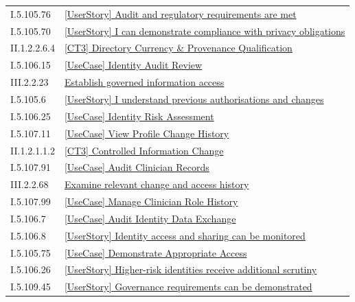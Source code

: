 \begin{longtable}{p{.22\linewidth}p{.73\linewidth}}
I.5.105.76 & \hyperref[element:099a6a3867e642549643b118e369f373]{[UserStory] Audit and regulatory requirements are met} \\
I.5.105.70 & \hyperref[element:0cda4d7a2b424c6a835ad371de1706ab]{[UserStory] I can demonstrate compliance with privacy obligations} \\
II.1.2.2.6.4 & \hyperref[element:21e0c3d5b39b4d6c9c082241150f1f09]{[CT3] Directory Currency \& Provenance Qualification} \\
I.5.106.15 & \hyperref[element:238b0a03b40b42e98701e8d815e8474d]{[UseCase] Identity Audit Review} \\
III.2.2.23 & \hyperref[element:26719186d6444b5b80029fbf13ae7d06]{Establish governed information access} \\
I.5.105.6 & \hyperref[element:29d5c982a25a456aa61e273d0dbaad89]{[UserStory] I understand previous authorisations and changes} \\
I.5.106.25 & \hyperref[element:29ed8bc9509742f4be49e07fed848510]{[UseCase] Identity Risk Assessment} \\
I.5.107.11 & \hyperref[element:2c2a6d9b0f6549e8ab880d7c5b6064ba]{[UseCase] View Profile Change History} \\
II.1.2.1.1.2 & \hyperref[element:2eed03f280434e369d7118b63259c02d]{[CT3] Controlled Information Change} \\
I.5.107.91 & \hyperref[element:38728966a1a144aeacdf62cef66a0c75]{[UseCase] Audit Clinician Records} \\
III.2.2.68 & \hyperref[element:39211c37cd3c4d3a8cdfe49d044c7f43]{Examine relevant change and access history} \\
I.5.107.99 & \hyperref[element:3dbbb21b0e17424ca5c794d445318efe]{[UseCase] Manage Clinician Role History} \\
I.5.106.7 & \hyperref[element:479068521a1247b1b9df87c6e32915a7]{[UseCase] Audit Identity Data Exchange} \\
I.5.106.8 & \hyperref[element:48cf293260dc4beaa537c1d68bc58ff4]{[UserStory] Identity access and sharing can be monitored} \\
I.5.105.75 & \hyperref[element:4e2d087b91ed427ca552e962022c6d26]{[UseCase] Demonstrate Appropriate Access} \\
I.5.106.26 & \hyperref[element:50a222a114ed4dae847b82a5b7e87dd2]{[UserStory] Higher-risk identities receive additional scrutiny} \\
I.5.109.45 & \hyperref[element:532a0886cf184aefbe8e27425fba0ef2]{[UserStory] Governance requirements can be demonstrated} \\

\end{longtable}
